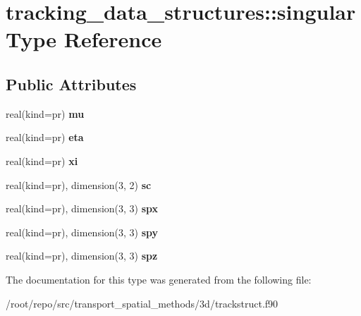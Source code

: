 \hypertarget{structtracking__data__structures_1_1singular}{}\section{tracking\+\_\+data\+\_\+structures\+:\+:singular Type Reference}
\label{structtracking__data__structures_1_1singular}
\subsection*{Public Attributes}
\begin{DoxyCompactItemize}
\item 
\mbox{\label{structtracking__data__structures_1_1singular_acd79fe7d9374778a1a073f01d33bc323}} 
real(kind=pr) {\bfseries mu}
\item 
\mbox{\label{structtracking__data__structures_1_1singular_a8015e49ee70edd759eb801446b40de59}} 
real(kind=pr) {\bfseries eta}
\item 
\mbox{\label{structtracking__data__structures_1_1singular_ac42e62b9f85705c6e68a6d07bc6c889c}} 
real(kind=pr) {\bfseries xi}
\item 
\mbox{\label{structtracking__data__structures_1_1singular_ae99e040b2944a8f103cb730cef072f7b}} 
real(kind=pr), dimension(3, 2) {\bfseries sc}
\item 
\mbox{\label{structtracking__data__structures_1_1singular_aeb81711c1d7153fe3dc8eae682f08134}} 
real(kind=pr), dimension(3, 3) {\bfseries spx}
\item 
\mbox{\label{structtracking__data__structures_1_1singular_ab7f1cf71b301b3dd7b30004bb3fecbea}} 
real(kind=pr), dimension(3, 3) {\bfseries spy}
\item 
\mbox{\label{structtracking__data__structures_1_1singular_a5bfe4d508ca8ba24ddd3c14c20c03086}} 
real(kind=pr), dimension(3, 3) {\bfseries spz}
\end{DoxyCompactItemize}


The documentation for this type was generated from the following file\+:\begin{DoxyCompactItemize}
\item 
/root/repo/src/transport\+\_\+spatial\+\_\+methods/3d/trackstruct.\+f90\end{DoxyCompactItemize}
